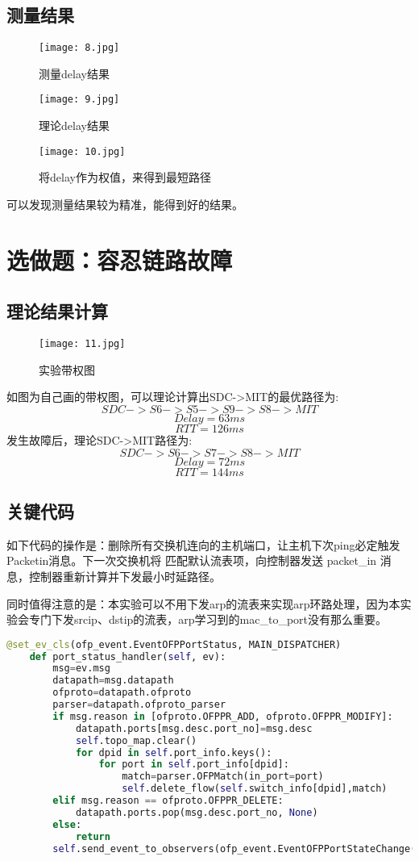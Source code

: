 \documentclass{xjtureport}
\begin{document}
\subsection{测量结果}
\begin{figure}[H]
	\centering
	\texttt{[image: 8.jpg]}
	\caption{测量delay结果}
\end{figure}
\begin{figure}[H]
	\centering
	\texttt{[image: 9.jpg]}
	\caption{理论delay结果}
\end{figure}
\begin{figure}[H]
	\centering
	\texttt{[image: 10.jpg]}
	\caption{将delay作为权值，来得到最短路径}
\end{figure}
可以发现测量结果较为精准，能得到好的结果。
\section{选做题：容忍链路故障}
\subsection{理论结果计算}
\begin{figure}[H]
	\centering
	\texttt{[image: 11.jpg]}
	\caption{实验带权图}
\end{figure}
如图为自己画的带权图，可以理论计算出SDC->MIT的最优路径为:
$$
SDC -> S6 -> S5 -> S9 -> S8 -> MIT
$$
$$
Delay=63ms
$$
$$
RTT=126ms
$$
\quad \quad 发生故障后，理论SDC->MIT路径为:
$$
SDC -> S6 -> S7 -> S8 -> MIT
$$
$$
Delay=72ms
$$
$$
RTT=144ms
$$
\subsection{关键代码}
如下代码的操作是：删除所有交换机连向的主机端口，让主机下次ping必定触发Packetin消息。下一次交换机将
匹配默认流表项，向控制器发送 packet\_in 消息，控制器重新计算并下发最小时延路径。\par
同时值得注意的是：本实验可以不用下发arp的流表来实现arp环路处理，因为本实验会专门下发srcip、dstip的流表，arp学习到的mac\_to\_port没有那么重要。
\begin{lstlisting}[language=python]
	@set_ev_cls(ofp_event.EventOFPPortStatus, MAIN_DISPATCHER)
	def port_status_handler(self, ev):
		msg=ev.msg
		datapath=msg.datapath
		ofproto=datapath.ofproto
		parser=datapath.ofproto_parser
		if msg.reason in [ofproto.OFPPR_ADD, ofproto.OFPPR_MODIFY]:
			datapath.ports[msg.desc.port_no]=msg.desc
			self.topo_map.clear()
			for dpid in self.port_info.keys():
				for port in self.port_info[dpid]:
					match=parser.OFPMatch(in_port=port)
					self.delete_flow(self.switch_info[dpid],match)
		elif msg.reason == ofproto.OFPPR_DELETE:
			datapath.ports.pop(msg.desc.port_no, None)
		else:
			return
		self.send_event_to_observers(ofp_event.EventOFPPortStateChange(datapath, msg.reason, 	msg.desc.port_no),datapath.state)
\end{lstlisting}
\end{document}
